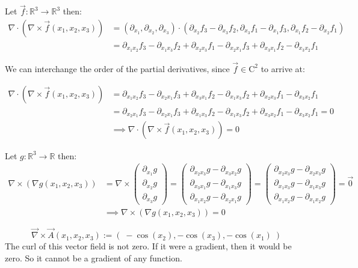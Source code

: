 \documentclass[11pt]{article}
\begin{document}
\begin{solution}
Let $\vec{f} \colon \mathbb{R}^3 \to \mathbb{R}^3$ then:
\begin{align*}
     \nabla \cdot (\nabla \times \vec{f}(x_1,x_2,x_3)) &= (\partial_{x_1}, \partial_{x_2}, \partial_{x_3}) \cdot (\partial _{x_2} f_3 - \partial _{x_3} f_2,\partial _{x_3} f_1 - \partial _{x_1} f_3,\partial _{x_1} f_2 - \partial _{x_2} f_1)  \\
 &=  \partial_{x_1 x_2}f_3 - \partial_{x_1 x_3}f_2 + \partial _{x_2 x_3} f_1 - \partial _{x_2 x_1} f_3 + \partial _{x_3 x_1} f_2 - \partial _{x_3 x_2} f_1
\end{align*}

We can interchange the order of the partial derivatives, since $\vec{f} \in \mathrm{C}^2$ to arrive at:

\begin{align*}
 \nabla \cdot (\nabla \times \vec{f}(x_1,x_2,x_3)) &=	 \partial_{x_1 x_2}f_3 - \partial _{x_2 x_1} f_3 + \partial _{x_3 x_1} f_2 - \partial_{x_1 x_3}f_2 + \partial _{x_2 x_3} f_1  - \partial _{x_3 x_2} f_1\\
&=	 \partial_{x_2 x_1}f_3 - \partial _{x_2 x_1} f_3 + \partial _{x_1 x_3} f_2 - \partial_{x_1 x_3}f_2 + \partial _{x_3 x_2} f_1  - \partial _{x_3 x_2} f_1 = 0\\
&\implies  \nabla \cdot (\nabla \times \vec{f}(x_1,x_2,x_3)) =0
\end{align*}

Let  $g \colon \mathbb{R}^3 \to \mathbb{R}$ then: 
\begin{align*}
	\nabla \times (\nabla g(x_1,x_2,x_3)) &= \nabla \times \begin{pmatrix}\partial_{x_1} g \\ \partial_{x_2} g \\ \partial_{x_3} g \end{pmatrix} = \begin{pmatrix} \partial_{x_2x_3} g - \partial_{x_3x_2} g \\ \partial_{x_3x_1} g - \partial_{x_1x_3} g \\ \partial_{x_1x_2} g - \partial_{x_2x_1} g \end{pmatrix} = \begin{pmatrix} \partial_{x_2x_3} g - \partial_{x_2x_3} g \\ \partial_{x_1x_3} g - \partial_{x_1x_3} g \\ \partial_{x_1x_2} g - \partial_{x_1x_2} g \end{pmatrix} = \vec{0}\\
&\implies \nabla \times (\nabla g(x_1,x_2,x_3))  = 0
\end{align*}

    \[
        \vec{\nabla} \times \vec{A}(x_1,x_2,x_3)
        :=
        \left(\;
            -\cos(x_2),  -\cos(x_3), -\cos(x_1)
        \;\right)
    \]
    The curl of this vector field is not zero. 
    If it were a gradient, then it would be zero. 
    So it cannot be a gradient of any function.
     
\end{solution}
\end{document}
